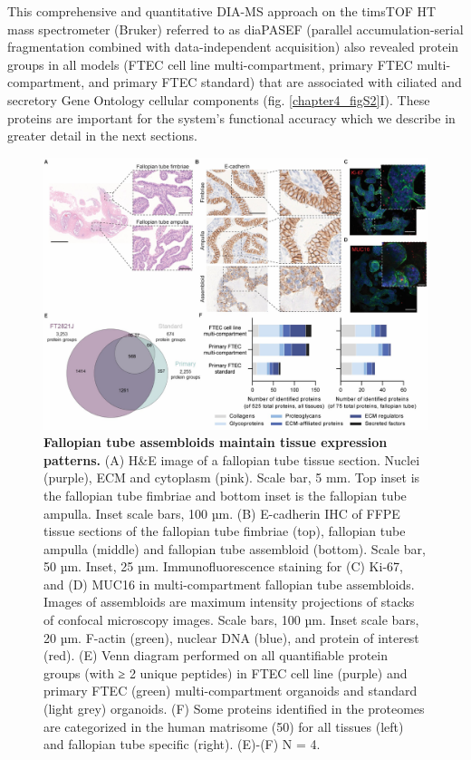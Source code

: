 \begin{refsection}
    This comprehensive and quantitative DIA-MS approach on the timsTOF HT mass spectrometer (Bruker) referred to as diaPASEF (parallel accumulation-serial fragmentation combined with data-independent acquisition)\cite{meier2020a} also revealed protein groups in all models (FTEC cell line multi-compartment, primary FTEC multi-compartment, and primary FTEC standard) that are associated with ciliated and secretory Gene Ontology\cite{ashburner2000a,aleksander2023a} cellular components (fig. \ref{chapter4_figS2}I). These proteins are important for the system’s functional accuracy which we describe in greater detail in the next sections. 

    \begin{figure}[p]
        \begin{center}
            \includegraphics[width=1\textwidth,height=0.85\textheight,keepaspectratio,clip,page=1]{figures/chapter4/fig_2.jpg}
            \captionsetup{font=small}
            \caption{\textbf{Fallopian tube assembloids maintain tissue expression patterns.} (A) H\&E image of a fallopian tube tissue section. Nuclei (purple), ECM and cytoplasm (pink). Scale bar, 5 mm. Top inset is the fallopian tube fimbriae and bottom inset is the fallopian tube ampulla. Inset scale bars, 100 µm. (B) E-cadherin IHC of FFPE tissue sections of the fallopian tube fimbriae (top), fallopian tube ampulla (middle) and fallopian tube assembloid (bottom). Scale bar, 50 µm. Inset, 25 µm. Immunofluorescence staining for (C) Ki-67, and (D) MUC16 in multi-compartment fallopian tube assembloids. Images of assembloids are maximum intensity projections of stacks of confocal microscopy images. Scale bars, 100 µm. Inset scale bars, 20 µm. F-actin (green), nuclear DNA (blue), and protein of interest (red). (E) Venn diagram performed on all quantifiable protein groups (with ≥ 2 unique peptides) in FTEC cell line (purple) and primary FTEC (green) multi-compartment organoids and standard (light grey) organoids. (F) Some proteins identified in the proteomes are categorized in the human matrisome (50) for all tissues (left) and fallopian tube specific (right). (E)-(F) N = 4.}
            \label{chapter4_fig2}
        \end{center}
    \end{figure}


\end{refsection}
